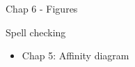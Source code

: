 \documentclass{report}
\begin{document}
\begin{itemise}   
\item  Chap 6 - Figures
\item  Spell checking

\end{itemise}


\begin{itemize}
  \item Chap 5: Affinity diagram
\end{itemize}
\end{document}
